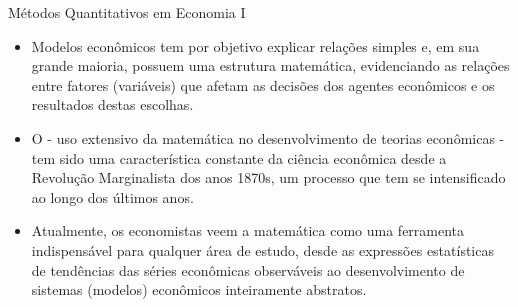 \documentclass[10pt]{beamer}
\begin{document}
\begin{frame}{Métodos Quantitativos em Economia I}
    \begin{itemize}
        \item Modelos econômicos tem por objetivo explicar relações simples e, em sua grande maioria, possuem uma estrutura matemática, evidenciando as relações entre fatores (variáveis) que afetam as decisões dos agentes econômicos e os resultados destas escolhas.\bigskip

        \item O  - uso extensivo da matemática no desenvolvimento de teorias econômicas - tem sido uma característica constante da ciência econômica desde a Revolução Marginalista dos anos 1870s, um processo que tem se intensificado ao longo dos últimos anos.\bigskip

        \item Atualmente, os economistas veem a matemática como uma ferramenta indispensável para qualquer área de estudo, desde as expressões estatísticas de tendências das séries econômicas observáveis ao desenvolvimento de sistemas (modelos) econômicos inteiramente abstratos.
    \end{itemize}
\end{frame}
\end{document}
